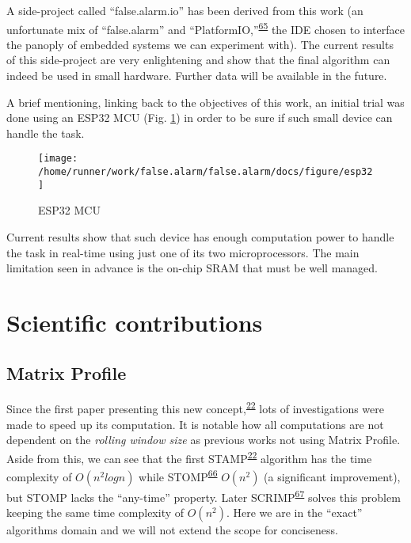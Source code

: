 \documentclass[12pt,twoside]{fmupthesis}
\begin{document}
A side-project called ``false.alarm.io'' has been derived from this work (an unfortunate mix of
``false.alarm'' and ``PlatformIO,''\textsuperscript{\protect\hyperlink{ref-PlatformIO}{65}} the IDE chosen to interface the panoply of embedded
systems we can experiment with). The current results of this side-project are very enlightening and
show that the final algorithm can indeed be used in small hardware. Further data will be available
in the future.

A brief mentioning, linking back to the objectives of this work, an initial trial was done using an
ESP32 MCU (Fig. \ref{fig:esp32}) in order to be sure if such small device can handle the task.
\begin{figure}

{\centering \texttt{[image: /home/runner/work/false.alarm/false.alarm/docs/figure/esp32]} 

}

\caption{ESP32 MCU}\label{fig:esp32}
\end{figure}
Current results show that such device has enough computation power to handle the task in real-time
using just one of its two microprocessors. The main limitation seen in advance is the on-chip SRAM
that must be well managed.

\hypertarget{scientific-contributions}{%
\chapter{Scientific contributions}\label{scientific-contributions}}

\hypertarget{matrix-profile}{%
\section{Matrix Profile}\label{matrix-profile}}

Since the first paper presenting this new concept,\textsuperscript{\protect\hyperlink{ref-Yeh2017a}{22}} lots of investigations were made to
speed up its computation. It is notable how all computations are not dependent on the \emph{rolling
window size} as previous works not using Matrix Profile. Aside from this, we can see that the first
STAMP\textsuperscript{\protect\hyperlink{ref-Yeh2017a}{22}} algorithm has the time complexity of \(O(n^2log{n})\) while STOMP\textsuperscript{\protect\hyperlink{ref-zhu2016}{66}}
\(O(n^2)\) (a significant improvement), but STOMP lacks the ``any-time'' property. Later SCRIMP\textsuperscript{\protect\hyperlink{ref-zhu2018}{67}} solves this problem keeping the same time complexity of \(O(n^2)\). Here we are in the
``exact'' algorithms domain and we will not extend the scope for conciseness.
\end{document}

